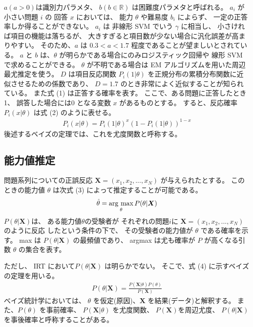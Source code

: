 \documentclass[12pt]{jarticle}
\newcommand{\argmax}{\mathop{\rm arg~max}\limits}
\begin{document}
$a(a > 0)$は識別力パラメタ、
$b(b \in \mathbb{R})$ は困難度パラメタと呼ばれる。
$a_i$ が小さい問題 $i$ の 回答 $x$ においては、
能力 $\theta$ や難易度 $b_i$ によらず、
一定の正答率しか得ることができない。
$a_i$ は 非線形 SVM でいう $\gamma$ に相当し、
小さければ項目の機能は落ちるが、
大きすぎると項目数が少ない場合に汎化誤差が高まりやすい。
そのため、$a$ は $0.3 < a < 1.7$ 程度であることが望ましいとされている。
$a$ と $b$ は、$\theta$ が明らかである場合にのみロジスティック回帰や
線形 SVM で求めることができる。
$\theta$ が不明である場合は EM アルゴリズムを用いた周辺最尤推定を使う。
$D$ は項目反応関数 $P_i(1|\theta)$ を正規分布の累積分布関数に近似させるための係数であり、
$D = 1.7$ のとき非常によく近似することが知られている。
また式 (1) は正答する確率を表す。
ここで、ある問題に正答したとき1、
誤答した場合には0 となる変数 $x$ があるものとする。
すると、反応確率 $P_i(x|\theta)$ は式 (2) のように表せる。
\begin{eqnarray}
    P_i(x|\theta) = P_i(1|\theta)^x(1 − P_i(1|\theta))^{1−x}
\end{eqnarray}
後述するベイズの定理では、これを尤度関数と呼称する。

\clearpage

\subsection{能力値推定}
問題系列についての正誤反応 $\boldsymbol{X} = (x_1, x_2,..., x_N)$ が与えられたとする。
このときの能力値 $\theta$
は次式 (3) によって推定することが可能である。
\begin{eqnarray}
    \hat{\theta} = \argmax_\theta P(\theta|\boldsymbol{X})
\end{eqnarray}
$P(\theta|\boldsymbol{X})$は、
ある能力値$\theta$の受験者が
それぞれの問題$i$に $\boldsymbol{X} = (x_1,x_2,...,x_N)$ のように反応
したという条件の下で、
その受験者の能力値が $\theta$ である確率を示す。
max は $P(\theta|\boldsymbol{X})$ の最頻値であり、
argmax は尤も確率が $P$ が高くなる引数 $\theta$ の集合を表す。

ただし、
IRT において$P(\theta|\boldsymbol{X})$ は明らかでない。
そこで、式 (4) に示すベイズの定理を用いる。
\begin{eqnarray}
    P(\theta|\boldsymbol{X}) =   \frac{P(\boldsymbol{X}|\theta)P(\theta)}{P(\boldsymbol{X})}
\end{eqnarray}
べイズ統計学においては、
$\theta$ を仮定(原因)、$\boldsymbol{X}$ を結果(データ)と解釈する。
また、$P(\theta)$ を事前確率、
$P(\boldsymbol{X}|\theta)$ を尤度関数、
$P(\boldsymbol{X})$を周辺尤度、
$P(\theta|\boldsymbol{X})$を事後確率と呼称することがある。
\end{document}
